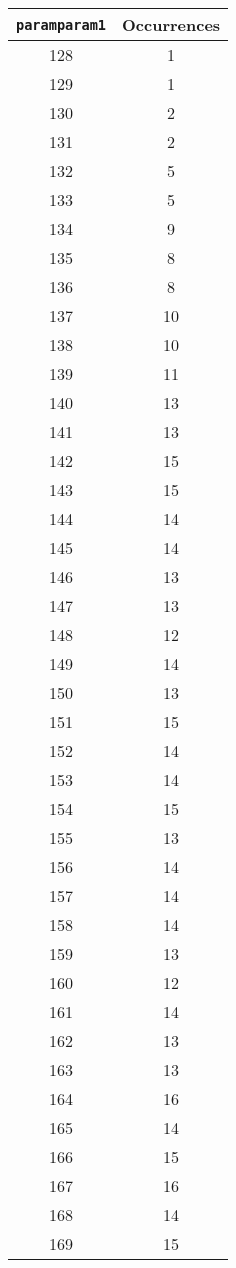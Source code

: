 \documentclass[letterpaper, 12pt]{article}
\begin{document}
\begin{longtable}{|c|c|}
\hline
\textbf{\texttt{paramparam1}} & \textbf{Occurrences} \\
\hline
128 & 1 \\
\hline
129 & 1 \\
\hline
130 & 2 \\
\hline
131 & 2 \\
\hline
132 & 5 \\
\hline
133 & 5 \\
\hline
134 & 9 \\
\hline
135 & 8 \\
\hline
136 & 8 \\
\hline
137 & 10 \\
\hline
138 & 10 \\
\hline
139 & 11 \\
\hline
140 & 13 \\
\hline
141 & 13 \\
\hline
142 & 15 \\
\hline
143 & 15 \\
\hline
144 & 14 \\
\hline
145 & 14 \\
\hline
146 & 13 \\
\hline
147 & 13 \\
\hline
148 & 12 \\
\hline
149 & 14 \\
\hline
150 & 13 \\
\hline
151 & 15 \\
\hline
152 & 14 \\
\hline
153 & 14 \\
\hline
154 & 15 \\
\hline
155 & 13 \\
\hline
156 & 14 \\
\hline
157 & 14 \\
\hline
158 & 14 \\
\hline
159 & 13 \\
\hline
160 & 12 \\
\hline
161 & 14 \\
\hline
162 & 13 \\
\hline
163 & 13 \\
\hline
164 & 16 \\
\hline
165 & 14 \\
\hline
166 & 15 \\
\hline
167 & 16 \\
\hline
168 & 14 \\
\hline
169 & 15 \\

\end{longtable}
\end{document}
